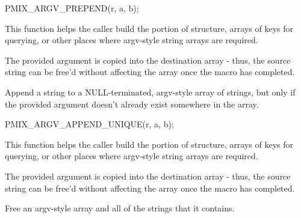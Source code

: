 \cspecificstart
\begin{codepar}
PMIX_ARGV_PREPEND(r, a, b);
\end{codepar}
\cspecificend

\begin{arglist}
\end{arglist}

This function helps the caller build the  portion of  structure, arrays of keys for querying, or other places where argv-style string arrays are required.

\adviceuserstart
The provided argument is copied into the destination array - thus, the source string can be free'd without affecting the array once the macro has completed.
\adviceuserend


Append a string to a NULL-terminated, argv-style array of strings, but only if the provided argument doesn't already exist somewhere in the array.

\cspecificstart
\begin{codepar}
PMIX_ARGV_APPEND_UNIQUE(r, a, b);
\end{codepar}
\cspecificend

\begin{arglist}
\end{arglist}

This function helps the caller build the  portion of  structure, arrays of keys for querying, or other places where argv-style string arrays are required.

\adviceuserstart
The provided argument is copied into the destination array - thus, the source string can be free'd without affecting the array once the macro has completed.
\adviceuserend


Free an argv-style array and all of the strings that it contains.


